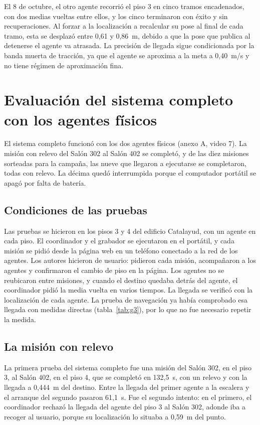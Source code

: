 El 8 de octubre, el otro agente recorrió el piso 3 en cinco tramos encadenados, con dos medias vueltas entre ellos, y los cinco terminaron con éxito y sin recuperaciones. Al forzar a la localización a recalcular su pose al final de cada tramo, esta se desplazó entre 0,61 y 0,86~m, debido a que la pose que publica al detenerse el agente va atrasada. La precisión de llegada sigue condicionada por la banda muerta de tracción, ya que el agente se aproxima a la meta a 0,40~m/s y no tiene régimen de aproximación fina.

\section{Evaluación del sistema completo con los agentes físicos}
\label{sec:res-completo}

El sistema completo funcionó con los dos agentes físicos (anexo A, video 7). La misión con relevo del Salón 302 al Salón 402 se completó, y de las diez misiones sorteadas para la campaña, las nueve que llegaron a ejecutarse se completaron, todas con relevo. La décima quedó interrumpida porque el computador portátil se apagó por falta de batería.

\subsection{Condiciones de las pruebas}

Las pruebas se hicieron en los pisos 3 y 4 del edificio Catalayud, con un agente en cada piso. El coordinador y el grabador se ejecutaron en el portátil, y cada misión se pidió desde la página web en un teléfono conectado a la red de los agentes. Los autores hicieron de usuario: pidieron cada misión, acompañaron a los agentes y confirmaron el cambio de piso en la página. Los agentes no se reubicaron entre misiones, y cuando el destino quedaba detrás del agente, el coordinador pidió la media vuelta en varios tiempos. La llegada se verificó con la localización de cada agente. La prueba de navegación ya había comprobado esa llegada con medidas directas (tabla~\ref{tab:g3}), por lo que no fue necesario repetir la medida.

\subsection{La misión con relevo}

La primera prueba del sistema completo fue una misión del Salón 302, en el piso 3, al Salón 402, en el piso 4, que se completó en 132,5~s, con un relevo y con la llegada a 0,444~m del destino. Entre la llegada del primer agente a la escalera y el arranque del segundo pasaron 61,1~s. Fue el segundo intento: en el primero, el coordinador rechazó la llegada del agente del piso 3 al Salón 302, adonde iba a recoger al usuario, porque su localización lo situaba a 0,59~m del punto.

